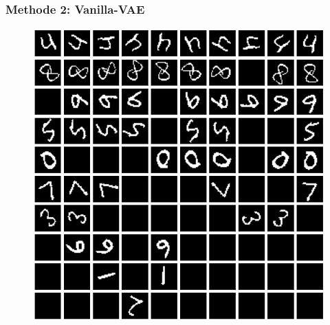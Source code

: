 \documentclass[12pt]{article}
\begin{document}
	\subsubsection{Methode 2: Vanilla-VAE}
		\begin{figure}[h!]
		\begin{minipage}{0.32\textwidth}
				\includegraphics[scale=0.22]{rotatingMNIST_VAE}
		\end{minipage}
		\begin{minipage}{0.32\textwidth}

\end{minipage}
\end{figure}
\end{document}
